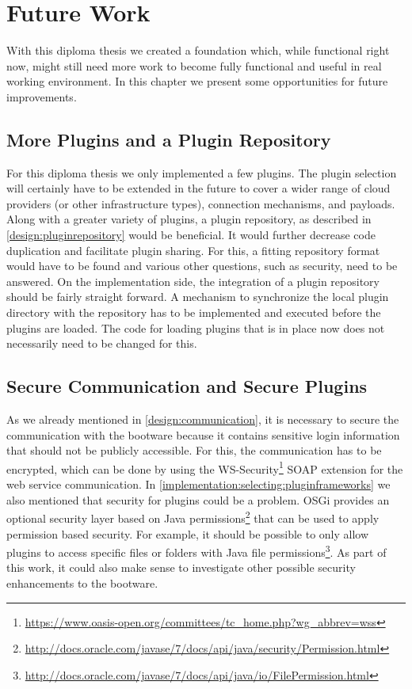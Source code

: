 \chapter{Future Work}
\label{future}

With this diploma thesis we created a foundation which, while functional right now, might still need more work to become fully functional and useful in real working environment.
In this chapter we present some opportunities for future improvements.

\section{More Plugins and a Plugin Repository}

For this diploma thesis we only implemented a few plugins.
The plugin selection will certainly have to be extended in the future to cover a wider range of cloud providers (or other infrastructure types), connection mechanisms, and payloads.
Along with a greater variety of plugins, a plugin repository, as described in \autoref{design:pluginrepository} would be beneficial.
It would further decrease code duplication and facilitate plugin sharing.
For this, a fitting repository format would have to be found and various other questions, such as security, need to be answered.
On the implementation side, the integration of a plugin repository should be fairly straight forward.
A mechanism to synchronize the local plugin directory with the repository has to be implemented and executed before the plugins are loaded.
The code for loading plugins that is in place now does not necessarily need to be changed for this.

\section{Secure Communication and Secure Plugins}

As we already mentioned in \autoref{design:communication}, it is necessary to secure the communication with the bootware because it contains sensitive login information that should not be publicly accessible.
For this, the communication has to be encrypted, which can be done by using the WS-Security\footnote{\url{https://www.oasis-open.org/committees/tc_home.php?wg_abbrev=wss}} SOAP extension for the web service communication.
In \autoref{implementation:selecting:pluginframeworks} we also mentioned that security for plugins could be a problem.
OSGi provides an optional security layer based on Java permissions\footnote{\url{http://docs.oracle.com/javase/7/docs/api/java/security/Permission.html}} that can be used to apply permission based security.
For example, it should be possible to only allow plugins to access specific files or folders with Java file permissions\footnote{\url{http://docs.oracle.com/javase/7/docs/api/java/io/FilePermission.html}}.
As part of this work, it could also make sense to investigate other possible security enhancements to the bootware.


